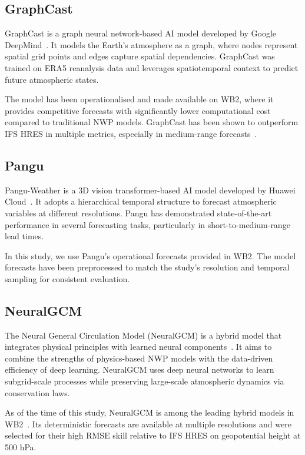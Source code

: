 \documentclass{article}
\begin{document}
\subsection{GraphCast}
GraphCast is a graph neural network-based AI model developed by Google DeepMind~\cite{lam2022graphcast}. It models the Earth's atmosphere as a graph, where nodes represent spatial grid points and edges capture spatial dependencies. GraphCast was trained on ERA5 reanalysis data and leverages spatiotemporal context to predict future atmospheric states.

The model has been operationalised and made available on WB2, where it provides competitive forecasts with significantly lower computational cost compared to traditional NWP models. GraphCast has been shown to outperform IFS HRES in multiple metrics, especially in medium-range forecasts~\cite{lam2022graphcast}.

\subsection{Pangu}
Pangu-Weather is a 3D vision transformer-based AI model developed by Huawei Cloud~\cite{bi2022pangu}. It adopts a hierarchical temporal structure to forecast atmospheric variables at different resolutions. Pangu has demonstrated state-of-the-art performance in several forecasting tasks, particularly in short-to-medium-range lead times.

In this study, we use Pangu's operational forecasts provided in WB2. The model forecasts have been preprocessed to match the study’s resolution and temporal sampling for consistent evaluation.

\subsection{NeuralGCM}
The Neural General Circulation Model (NeuralGCM) is a hybrid model that integrates physical principles with learned neural components~\cite{kochkov2023neuralgcm}. It aims to combine the strengths of physics-based NWP models with the data-driven efficiency of deep learning. NeuralGCM uses deep neural networks to learn subgrid-scale processes while preserving large-scale atmospheric dynamics via conservation laws.

As of the time of this study, NeuralGCM is among the leading hybrid models in WB2~\cite{rasp2024weatherbench2benchmarkgeneration}. Its deterministic forecasts are available at multiple resolutions and were selected for their high RMSE skill relative to IFS HRES on geopotential height at 500 hPa.
\end{document}
